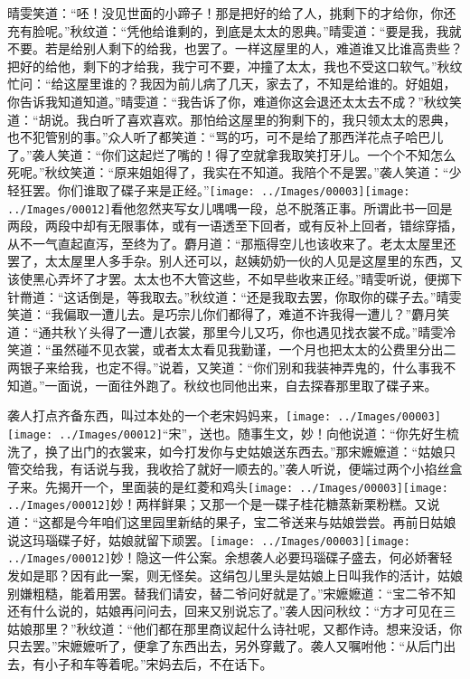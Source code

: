 晴雯笑道：``呸！没见世面的小蹄子！那是把好的给了人，挑剩下的才给你，你还充有脸呢。''秋纹道：``凭他给谁剩的，到底是太太的恩典。''晴雯道：``要是我，我就不要。若是给别人剩下的给我，也罢了。一样这屋里的人，难道谁又比谁高贵些？把好的给他，剩下的才给我，我宁可不要，冲撞了太太，我也不受这口软气。''秋纹忙问：``给这屋里谁的？我因为前儿病了几天，家去了，不知是给谁的。好姐姐，你告诉我知道知道。''晴雯道：``我告诉了你，难道你这会退还太太去不成？''秋纹笑道：``胡说。我白听了喜欢喜欢。那怕给这屋里的狗剩下的，我只领太太的恩典，也不犯管别的事。''众人听了都笑道：``骂的巧，可不是给了那西洋花点子哈巴儿了。''袭人笑道：``你们这起烂了嘴的！得了空就拿我取笑打牙儿。一个个不知怎么死呢。''秋纹笑道：``原来姐姐得了，我实在不知道。我陪个不是罢。''袭人笑道：``少轻狂罢。你们谁取了碟子来是正经。''{\texttt{[image: ../Images/00003]}\texttt{[image: ../Images/00012]}\footnotesize \kaishu 看他忽然夹写女儿喁喁一段，总不脱落正事。所谓此书一回是两段，两段中却有无限事体，或有一语透至下回者，或有反补上回者，错综穿插，从不一气直起直泻，至终为了。}麝月道：``那瓶得空儿也该收来了。老太太屋里还罢了，太太屋里人多手杂。别人还可以，赵姨奶奶一伙的人见是这屋里的东西，又该使黑心弄坏了才罢。太太也不大管这些，不如早些收来正经。''晴雯听说，便掷下针黹道：``这话倒是，等我取去。''秋纹道：``还是我取去罢，你取你的碟子去。''晴雯笑道：``我偏取一遭儿去。是巧宗儿你们都得了，难道不许我得一遭儿？''麝月笑道：``通共秋丫头得了一遭儿衣裳，那里今儿又巧，你也遇见找衣裳不成。''晴雯冷笑道：``虽然碰不见衣裳，或者太太看见我勤谨，一个月也把太太的公费里分出二两银子来给我，也定不得。''说着，又笑道：``你们别和我装神弄鬼的，什么事我不知道。''一面说，一面往外跑了。秋纹也同他出来，自去探春那里取了碟子来。

袭人打点齐备东西，叫过本处的一个老宋妈妈来，{\texttt{[image: ../Images/00003]}\texttt{[image: ../Images/00012]}\footnotesize \kaishu ``宋''，送也。随事生文，妙！}向他说道：``你先好生梳洗了，换了出门的衣裳来，如今打发你与史姑娘送东西去。''那宋嬷嬷道：``姑娘只管交给我，有话说与我，我收拾了就好一顺去的。''袭人听说，便端过两个小掐丝盒子来。先揭开一个，里面装的是红菱和鸡头{\texttt{[image: ../Images/00003]}\texttt{[image: ../Images/00012]}\footnotesize \kaishu 妙！}两样鲜果；又那一个是一碟子桂花糖蒸新栗粉糕。又说道：``这都是今年咱们这里园里新结的果子，宝二爷送来与姑娘尝尝。再前日姑娘说这玛瑙碟子好，姑娘就留下顽罢。{\texttt{[image: ../Images/00003]}\texttt{[image: ../Images/00012]}\footnotesize \kaishu 妙！隐这一件公案。余想袭人必要玛瑙碟子盛去，何必娇奢轻发如是耶？因有此一案，则无怪矣。}这绢包儿里头是姑娘上日叫我作的活计，姑娘别嫌粗糙，能着用罢。替我们请安，替二爷问好就是了。''宋嬷嬷道：``宝二爷不知还有什么说的，姑娘再问问去，回来又别说忘了。''袭人因问秋纹：``方才可见在三姑娘那里？''秋纹道：``他们都在那里商议起什么诗社呢，又都作诗。想来没话，你只去罢。''宋嬷嬷听了，便拿了东西出去，另外穿戴了。袭人又嘱咐他：``从后门出去，有小子和车等着呢。''宋妈去后，不在话下。

